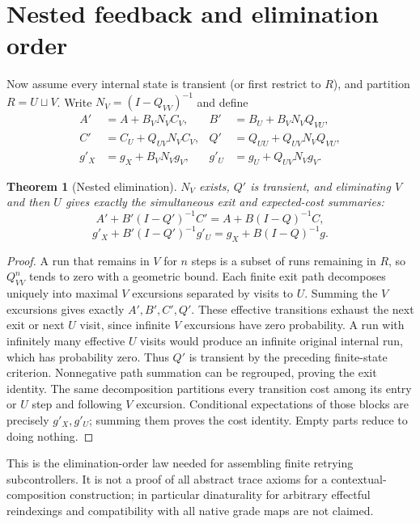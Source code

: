 \documentclass[11pt]{article}
\newtheorem{theorem}{Theorem}\newtheorem{proposition}{Proposition}
\begin{document}
\section{Nested feedback and elimination order}
Now assume every internal state is transient (or first restrict to $R$), and partition $R=U\sqcup V$. Write $N_V=(I-Q_{VV})^{-1}$ and define
\begin{align*}
 A'&=A+B_VN_VC_V,& B'&=B_U+B_VN_VQ_{VU},\\
 C'&=C_U+Q_{UV}N_VC_V,& Q'&=Q_{UU}+Q_{UV}N_VQ_{VU},\\
 g'_X&=g_X+B_VN_Vg_V,&g'_U&=g_U+Q_{UV}N_Vg_V.
\end{align*}
\begin{theorem}[Nested elimination]
$N_V$ exists, $Q'$ is transient, and eliminating $V$ and then $U$ gives exactly the simultaneous exit and expected-cost summaries:
\[A'+B'(I-Q')^{-1}C'=A+B(I-Q)^{-1}C,\]
\[g'_X+B'(I-Q')^{-1}g'_U=g_X+B(I-Q)^{-1}g.
\]
\end{theorem}
\begin{proof}
A run that remains in $V$ for $n$ steps is a subset of runs remaining in $R$, so $Q_{VV}^n$ tends to zero with a geometric bound. Each finite exit path decomposes uniquely into maximal $V$ excursions separated by visits to $U$. Summing the $V$ excursions gives exactly $A',B',C',Q'$. These effective transitions exhaust the next exit or next $U$ visit, since infinite $V$ excursions have zero probability. A run with infinitely many effective $U$ visits would produce an infinite original internal run, which has probability zero. Thus $Q'$ is transient by the preceding finite-state criterion. Nonnegative path summation can be regrouped, proving the exit identity. The same decomposition partitions every transition cost among its entry or $U$ step and following $V$ excursion. Conditional expectations of those blocks are precisely $g'_X,g'_U$; summing them proves the cost identity. Empty parts reduce to doing nothing.
\end{proof}
This is the elimination-order law needed for assembling finite retrying subcontrollers. It is not a proof of all abstract trace axioms for a contextual-composition construction; in particular dinaturality for arbitrary effectful reindexings and compatibility with all native grade maps are not claimed.
\end{document}
